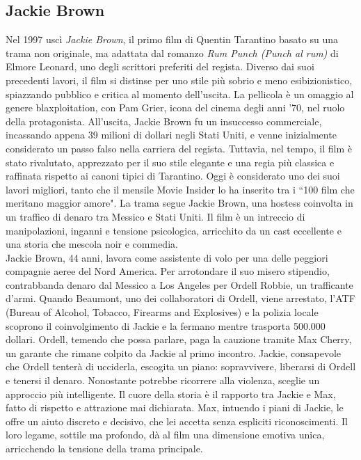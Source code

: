 \documentclass[12pt]{article} %
\begin{document}
\subsection{Jackie Brown}
\begin{flushleft}
    Nel 1997 uscì \textit{Jackie Brown}, il primo film di Quentin Tarantino basato su una trama non originale, ma adattata dal romanzo \textit{Rum Punch (Punch al rum)} di Elmore Leonard, uno degli scrittori preferiti del regista. Diverso dai suoi precedenti lavori, il film si distinse per uno stile più sobrio e meno esibizionistico, spiazzando pubblico e critica al momento dell’uscita.  
    La pellicola è un omaggio al genere blaxploitation, con Pam Grier, icona del cinema degli anni ’70, nel ruolo della protagonista. 
    All’uscita, Jackie Brown fu un insuccesso commerciale, incassando appena 39 milioni di dollari negli Stati Uniti, e venne inizialmente considerato un passo falso nella carriera del regista. Tuttavia, nel tempo, il film è stato rivalutato, apprezzato per il suo stile elegante e una regia più classica e raffinata rispetto ai canoni tipici di Tarantino. Oggi è considerato uno dei suoi lavori migliori, tanto che il mensile Movie Insider lo ha inserito tra i ``100 film che meritano maggior amore". 
    La trama segue Jackie Brown, una hostess coinvolta in un traffico di denaro tra Messico e Stati Uniti. Il film è un intreccio di manipolazioni, inganni e tensione psicologica, arricchito da un cast eccellente e una storia che mescola noir e commedia. 
    \\\vspace{1cm}
    Jackie Brown, 44 anni, lavora come assistente di volo per una delle peggiori compagnie aeree del Nord America. Per arrotondare il suo misero stipendio, contrabbanda denaro dal Messico a Los Angeles per Ordell Robbie, un trafficante d'armi. Quando Beaumont, uno dei collaboratori di Ordell, viene arrestato, l’ATF (Bureau of Alcohol, Tobacco, Firearms and Explosives) e la polizia locale scoprono il coinvolgimento di Jackie e la fermano mentre trasporta 500.000 dollari.  Ordell, temendo che possa parlare, paga la cauzione tramite Max Cherry, un garante che rimane colpito da Jackie al primo incontro. Jackie, consapevole che Ordell tenterà di ucciderla, escogita un piano: sopravvivere, liberarsi di Ordell e tenersi il denaro. Nonostante potrebbe ricorrere alla violenza, sceglie un approccio più intelligente.  Il cuore della storia è il rapporto tra Jackie e Max, fatto di rispetto e attrazione mai dichiarata. Max, intuendo i piani di Jackie, le offre un aiuto discreto e decisivo, che lei accetta senza espliciti riconoscimenti. Il loro legame, sottile ma profondo, dà al film una dimensione emotiva unica, arricchendo la tensione della trama principale.

\end{flushleft}
\end{document}
